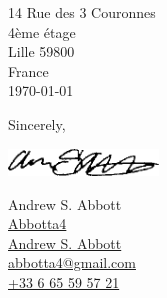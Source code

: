 \documentclass[10pt]{letter}
\begin{document}
\pagestyle{empty}

14 Rue des 3 Couronnes\\
4ème étage\\
Lille 59800\\
France\\
\today



Sincerely,\par
\includegraphics[width=4cm]{signature.png}\par
Andrew S. Abbott\\
\faGithub \href{https://github.com/Abbotta4}{Abbotta4}\\
\faLinkedin \href{https://www.linkedin.com/in/andrew-abbott-2269b393/}{Andrew S. Abbott}\\
\faEnvelope \href{mailto:abbotta4@gmail.com}{abbotta4@gmail.com}\\
\faPhone* \href{Tel:00330665595721}{+33 6 65 59 57 21}
\end{document}
